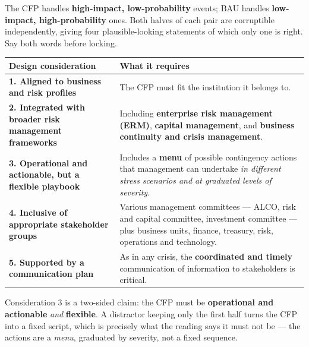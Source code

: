 \begin{lrtrapbox}
The CFP handles \textbf{high-impact, low-probability} events; BAU handles \textbf{low-impact, high-probability} ones. Both halves of each pair are corruptible independently, giving four plausible-looking statements of which only one is right. Say both words before locking.
\end{lrtrapbox}


\begin{center}
\small
\begin{tabularx}{\textwidth}{@{}p{4.4cm} X@{}}
\toprule
\rowcolor{FRMSoft}\textbf{Design consideration} & \textbf{What it requires} \\
\midrule
\textbf{1. Aligned to business and risk profiles} & The CFP must fit the institution it belongs to. \\
\addlinespace
\textbf{2. Integrated with broader risk management frameworks} & Including \textbf{enterprise risk management (ERM)}, \textbf{capital management}, and \textbf{business continuity and crisis management}. \\
\addlinespace
\textbf{3. Operational and actionable, but a flexible playbook} & Includes a \textbf{menu} of possible contingency actions that management can undertake \emph{in different stress scenarios and at graduated levels of severity}. \\
\addlinespace
\textbf{4. Inclusive of appropriate stakeholder groups} & Various management committees --- ALCO, risk and capital committee, investment committee --- plus business units, finance, treasury, risk, operations and technology. \\
\addlinespace
\textbf{5. Supported by a communication plan} & As in any crisis, the \textbf{coordinated and timely} communication of information to stakeholders is critical. \\
\bottomrule
\end{tabularx}
\end{center}

\begin{lrtrapbox}
Consideration 3 is a two-sided claim: the CFP must be \textbf{operational and actionable} \emph{and} \textbf{flexible}. A distractor keeping only the first half turns the CFP into a fixed script, which is precisely what the reading says it must not be --- the actions are a \emph{menu}, graduated by severity, not a fixed sequence.
\end{lrtrapbox}

